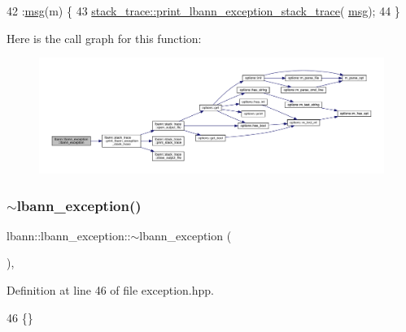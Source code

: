 \begin{DoxyCode}
42                                                           :\hyperlink{classlbann_1_1lbann__exception_a8698ff209b53c8452b5ca1d0caf7b824}{msg}(m) \{ 
43     \hyperlink{namespacelbann_1_1stack__trace_ae7396b3b0ee5d087a045f04ce690cae4}{stack\_trace::print\_lbann\_exception\_stack\_trace}(
      \hyperlink{classlbann_1_1lbann__exception_a8698ff209b53c8452b5ca1d0caf7b824}{msg});
44   \}
\end{DoxyCode}
Here is the call graph for this function\+:\nopagebreak
\begin{figure}[H]
\begin{center}
\leavevmode
\includegraphics[width=350pt]{classlbann_1_1lbann__exception_adbbe5260b3e3bd951ed2cb9363040f4a_cgraph}
\end{center}
\end{figure}
\mbox{\label{classlbann_1_1lbann__exception_aac6b1cde216d2ba2d5becc11c17dfb2e}} 
\subsubsection{\texorpdfstring{$\sim$lbann\+\_\+exception()}{~lbann\_exception()}}
{\footnotesize\ttfamily lbann\+::lbann\+\_\+exception\+::$\sim$lbann\+\_\+exception (\begin{DoxyParamCaption}{ }\end{DoxyParamCaption})\hspace{0.3cm}{\ttfamily [inline]}, {\ttfamily [override]}}



Definition at line 46 of file exception.\+hpp.


\begin{DoxyCode}
46 \{\}
\end{DoxyCode}


